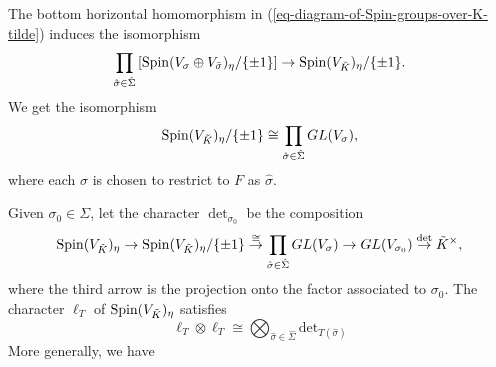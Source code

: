 \documentclass[12pt]{amsart}
\newcommand{\hide}[1]{}
\numberwithin{equation}{subsection}
\theoremstyle{plain}
\theoremstyle{definition}
\newcommand{\ZZ}{{\mathbb Z}}
\newcommand{\Spin}{{\rm Spin}}
\newcommand{\IsomRightArrow}{\stackrel{\cong}{\rightarrow}}
\newcommand{\RightArrowOf}[1]{\stackrel{#1}{\rightarrow}}
\begin{document}
{%
\hide{
We have the left exact sequence
\[
1\rightarrow \Spin(V_{\tilde{K}})_\eta \rightarrow \prod_{\hat{\sigma}\in\hat{\Sigma}}G(V_\sigma\oplus V_{\bar{\sigma}})_\eta\RightArrowOf{j} \tilde{K}^\times\times \ZZ/2\ZZ,
\]
where 
\[
j((g_{\hat{\sigma}})_{\hat{\sigma}\in\hat{\Sigma}})=\left(\prod_{\hat{\sigma}\in\hat{\Sigma}}N(g_{\hat{\sigma}}),\sum_{\hat{\sigma}\in\hat{\Sigma}}p(g_{\hat{\sigma}})\right),
\]
$N:G(V_\sigma\oplus V_{\bar{\sigma}})\rightarrow\tilde{K}^\times$ is the norm\footnote{
The norm character $N:G(V_{\tilde{K}})\rightarrow \tilde{K}$ is defined by 
$N(g)=g\tau(g)$ as an element of the center $\tilde{K}$ of the Clifford algebra $C(V_{\tilde{K}})$. 
If $g=v_1\cdots v_k$, for $v_i\in V_{\tilde{K}}$, then $N(g)=\prod_{i=1}^k\frac{(v_i,v_i)}{2}$. See \cite[Sec. II.2.3]{chevalley}.
}
character,
and $p:G(V_\sigma\oplus V_{\bar{\sigma}})\rightarrow \ZZ/2\ZZ$ is the parity character. Denote by 
\[
N_{\hat{\sigma}}:\Spin(V_{\tilde{K}})_\eta\rightarrow \tilde{K}^\times \ \mbox{and} \ 
p_{\hat{\sigma}}:\Spin(V_{\tilde{K}})_\eta\rightarrow \ZZ/2\ZZ
\] 
the restriction of the norm and parity characters of the factor $G(V_\sigma\oplus V_{\bar{\sigma}})_\eta$. 
Let the character $\det_\sigma$ be the composition  
\[
\Spin(V_{\tilde{K}})_\eta \rightarrow G(V_\sigma\oplus V_{\bar{\sigma}})_\eta\rightarrow O(V_\sigma\oplus V_{\bar{\sigma}})_\eta\rightarrow GL(V_\sigma)\RightArrowOf{\det} \tilde{K}^\times.
\]
}
The bottom horizontal homomorphism in (\ref{eq-diagram-of-Spin-groups-over-K-tilde}) induces the isomorphism
\[
\prod_{\hat{\sigma}\in\hat{\Sigma}}\left[\Spin(V_\sigma\oplus V_{\bar{\sigma}})_\eta /\{\pm 1\}\right]
\rightarrow
\Spin(V_{\tilde{K}})_\eta/\{\pm 1\}.
\]
We get the isomorphism
\begin{equation}
\label{eq-factorization-of-Spin-V-tilde-K-eta-mod-pm1}
\Spin(V_{\tilde{K}})_\eta/\{\pm 1\}\cong \prod_{\hat{\sigma}\in\hat{\Sigma}}GL(V_\sigma),
\end{equation}
where each $\sigma$ is chosen to restrict to $F$ as $\hat{\sigma}$.

Given $\sigma_0\in\Sigma$, 
let the character $\det_{\sigma_0}$ be the composition  
\[
\Spin(V_{\tilde{K}})_\eta \rightarrow \Spin(V_{\tilde{K}})_\eta/\{\pm 1\} 
\IsomRightArrow
\prod_{\hat{\sigma}\in\hat{\Sigma}}GL(V_\sigma)
\rightarrow GL(V_{\sigma_0}) \RightArrowOf{\det} \tilde{K}^\times,
\]
where 
the third arrow is the projection onto the factor associated to $\sigma_0$.
The character $\ell_T$ of $\Spin(V_{\tilde{K}})_\eta$ satisfies 
\[
\ell_T\otimes\ell_T\cong \bigotimes_{\hat{\sigma}\in\hat{\Sigma}}\mbox{det}_{T(\hat{\sigma})}
\]
More generally, we have

}
\end{document}
